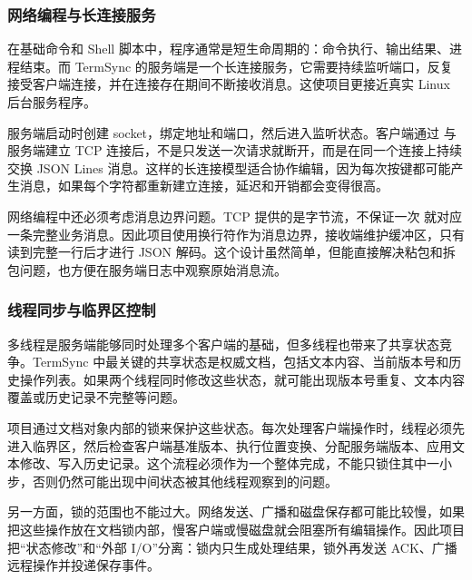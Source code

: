 \subsubsection{网络编程与长连接服务}

在基础命令和 Shell 脚本中，程序通常是短生命周期的：命令执行、输出结果、进程结束。而 TermSync 的服务端是一个长连接服务，它需要持续监听端口，反复接受客户端连接，并在连接存在期间不断接收消息。这使项目更接近真实 Linux 后台服务程序。

服务端启动时创建 socket，绑定地址和端口，然后进入监听状态。客户端通过  与服务端建立 TCP 连接后，不是只发送一次请求就断开，而是在同一个连接上持续交换 JSON Lines 消息。这样的长连接模型适合协作编辑，因为每次按键都可能产生消息，如果每个字符都重新建立连接，延迟和开销都会变得很高。

网络编程中还必须考虑消息边界问题。TCP 提供的是字节流，不保证一次  就对应一条完整业务消息。因此项目使用换行符作为消息边界，接收端维护缓冲区，只有读到完整一行后才进行 JSON 解码。这个设计虽然简单，但能直接解决粘包和拆包问题，也方便在服务端日志中观察原始消息流。

\subsubsection{线程同步与临界区控制}

多线程是服务端能够同时处理多个客户端的基础，但多线程也带来了共享状态竞争。TermSync 中最关键的共享状态是权威文档，包括文本内容、当前版本号和历史操作列表。如果两个线程同时修改这些状态，就可能出现版本号重复、文本内容覆盖或历史记录不完整等问题。

项目通过文档对象内部的锁来保护这些状态。每次处理客户端操作时，线程必须先进入临界区，然后检查客户端基准版本、执行位置变换、分配服务端版本、应用文本修改、写入历史记录。这个流程必须作为一个整体完成，不能只锁住其中一小步，否则仍然可能出现中间状态被其他线程观察到的问题。

另一方面，锁的范围也不能过大。网络发送、广播和磁盘保存都可能比较慢，如果把这些操作放在文档锁内部，慢客户端或慢磁盘就会阻塞所有编辑操作。因此项目把“状态修改”和“外部 I/O”分离：锁内只生成处理结果，锁外再发送 ACK、广播远程操作并投递保存事件。

